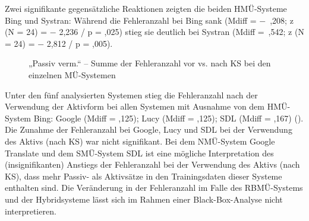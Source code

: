 
Zwei signifikante gegensätzliche Reaktionen zeigten die beiden HMÜ-Systeme Bing und Systran: Während die Fehleranzahl bei Bing sank (Mdiff = $-$~,208; z (N = 24) = $-$ 2,236 / p = ,025) stieg sie deutlich bei Systran (Mdiff =~,542; z (N = 24) = $-$ 2,812 / p = ,005).


\begin{figure}











\caption{\label{fig:05:87}„Passiv verm.“ -- Summe der Fehleranzahl vor vs. nach KS bei den einzelnen MÜ-Systemen   }
\end{figure}

Unter den fünf analysierten Systemen stieg die Fehleranzahl nach der Verwendung der Aktivform bei allen Systemen mit Ausnahme von dem HMÜ-System Bing: Google (Mdiff = ,125); Lucy (Mdiff = ,125); SDL (Mdiff = ,167) (). Die Zunahme der Fehleranzahl bei Google, Lucy und SDL bei der Verwendung des Aktivs (nach KS) war nicht signifikant. Bei dem NMÜ-System Google Translate und dem SMÜ-System SDL ist eine mögliche Interpretation des (insignifikanten) Anstiegs der Fehleranzahl bei der Verwendung des Aktivs (nach KS), dass mehr Passiv- als Aktivsätze in den Trainingsdaten dieser Systeme enthalten sind. Die Veränderung in der Fehleranzahl im Falle des RBMÜ-Systems und der Hybridsysteme lässt sich im Rahmen einer Black-Box-Analyse nicht interpretieren.

